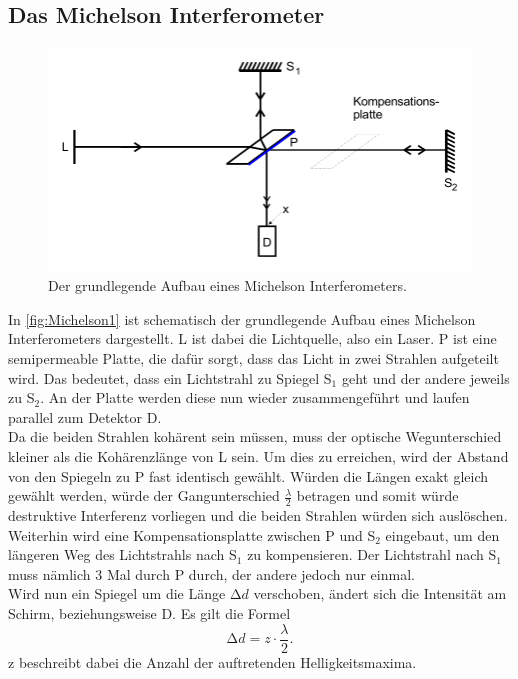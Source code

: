 \subsection{Das Michelson Interferometer}

\begin{figure}
    \centering
    \includegraphics[width=0.8 \linewidth]{pictures/Michelson1.pdf}
    \caption{Der grundlegende Aufbau eines Michelson Interferometers. \cite{v401}}
    \label{fig:Michelson1}
\end{figure}

In \autoref{fig:Michelson1} ist schematisch der grundlegende Aufbau eines Michelson Interferometers dargestellt.
L ist dabei die Lichtquelle, also ein Laser. P ist eine semipermeable Platte, die dafür sorgt, dass das Licht
in zwei Strahlen aufgeteilt wird. Das bedeutet, dass ein Lichtstrahl zu Spiegel S$_1$ geht und der andere jeweils zu S$_2$.
An der Platte werden diese nun wieder zusammengeführt und laufen parallel zum Detektor D.\\
Da die beiden Strahlen kohärent sein müssen, muss der optische Wegunterschied kleiner als die Kohärenzlänge von L sein.
Um dies zu erreichen, wird der Abstand von den Spiegeln zu P fast identisch gewählt.
Würden die Längen exakt gleich gewählt werden, würde der Gangunterschied $\frac{\lambda}{2}$ betragen und
somit würde destruktive Interferenz vorliegen und die beiden Strahlen würden sich auslöschen.
Weiterhin wird eine Kompensationsplatte zwischen P und S$_2$ eingebaut, um den längeren Weg des Lichtstrahls nach S$_1$ zu kompensieren.
Der Lichtstrahl nach S$_1$ muss nämlich 3 Mal durch P durch, der andere jedoch nur einmal.\\
Wird nun ein Spiegel um die Länge $\increment d$ verschoben, ändert sich die Intensität am Schirm, beziehungsweise D.
Es gilt die Formel
\begin{equation} \label{eq:delta_d}
    \increment d = z \cdot \frac{\lambda}{2}.
\end{equation}
z beschreibt dabei die Anzahl der auftretenden Helligkeitsmaxima.


